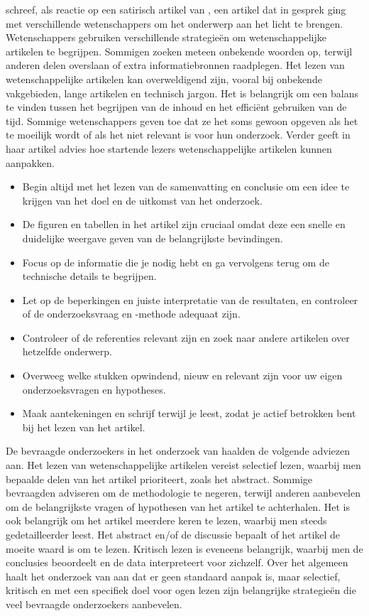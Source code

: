 \textcite{Pain2016} schreef, als reactie op een satirisch artikel van \textcite{Ruben2016}, een artikel dat in gesprek ging met verschillende wetenschappers om het onderwerp aan het licht te brengen. Wetenschappers gebruiken verschillende strategieën om wetenschappelijke artikelen te begrijpen. Sommigen zoeken meteen onbekende woorden op, terwijl anderen delen overslaan of extra informatiebronnen raadplegen. Het lezen van wetenschappelijke artikelen kan overweldigend zijn, vooral bij onbekende vakgebieden, lange artikelen en technisch jargon. Het is belangrijk om een balans te vinden tussen het begrijpen van de inhoud en het efficiënt gebruiken van de tijd. Sommige wetenschappers geven toe dat ze het soms gewoon opgeven als het te moeilijk wordt of als het niet relevant is voor hun onderzoek. Verder geeft \textcite{Pain2016} in haar artikel advies hoe startende lezers wetenschappelijke artikelen kunnen aanpakken.

\begin{itemize}
	\item Begin altijd met het lezen van de samenvatting en conclusie om een idee te krijgen van het doel en de uitkomst van het onderzoek.
	\item De figuren en tabellen in het artikel zijn cruciaal omdat deze een snelle en duidelijke weergave geven van de belangrijkste bevindingen.
	\item Focus op de informatie die je nodig hebt en ga vervolgens terug om de technische details te begrijpen.
	\item Let op de beperkingen en juiste interpretatie van de resultaten, en controleer of de onderzoeksvraag en -methode adequaat zijn.
	\item Controleer of de referenties relevant zijn en zoek naar andere artikelen over hetzelfde onderwerp.
	\item Overweeg welke stukken opwindend, nieuw en relevant zijn voor uw eigen onderzoeksvragen en hypotheses.
	\item Maak aantekeningen en schrijf terwijl je leest, zodat je actief betrokken bent bij het lezen van het artikel.
\end{itemize}

De bevraagde onderzoekers in het onderzoek van \textcite{Hubbard2017} haalden de volgende adviezen aan. Het lezen van wetenschappelijke artikelen vereist selectief lezen, waarbij men bepaalde delen van het artikel prioriteert, zoals het abstract. Sommige bevraagden adviseren om de methodologie te negeren, terwijl anderen aanbevelen om de belangrijkste vragen of hypothesen van het artikel te achterhalen. Het is ook belangrijk om het artikel meerdere keren te lezen, waarbij men steeds gedetailleerder leest. Het abstract en/of de discussie bepaalt of het artikel de moeite waard is om te lezen. Kritisch lezen is eveneens belangrijk, waarbij men de conclusies beoordeelt en de data interpreteert voor zichzelf. Over het algemeen haalt het onderzoek van \textcite{Hubbard2017} aan dat er geen standaard aanpak is, maar selectief, kritisch en met een specifiek doel voor ogen lezen zijn belangrijke strategieën die veel bevraagde onderzoekers aanbevelen.

